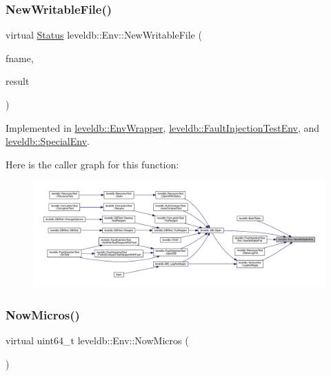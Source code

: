 \subsubsection{\texorpdfstring{NewWritableFile()}{NewWritableFile()}}
{\footnotesize\ttfamily virtual \mbox{\hyperlink{classleveldb_1_1_status}{Status}} leveldb\+::\+Env\+::\+New\+Writable\+File (\begin{DoxyParamCaption}\item[{const std\+::string \&}]{fname,  }\item[{\mbox{\hyperlink{classleveldb_1_1_writable_file}{Writable\+File}} $\ast$$\ast$}]{result }\end{DoxyParamCaption})\hspace{0.3cm}{\ttfamily [pure virtual]}}



Implemented in \mbox{\hyperlink{classleveldb_1_1_env_wrapper_a3e4991deec0666b177cf0f699efa2ca8}{leveldb\+::\+Env\+Wrapper}}, \mbox{\hyperlink{classleveldb_1_1_fault_injection_test_env_a1e89cf48116748a2f7d8c07022eab4f7}{leveldb\+::\+Fault\+Injection\+Test\+Env}}, and \mbox{\hyperlink{classleveldb_1_1_special_env_a2a8b88051ccc5f957321d47af0dae5ed}{leveldb\+::\+Special\+Env}}.

Here is the caller graph for this function\+:
\nopagebreak
\begin{figure}[H]
\begin{center}
\leavevmode
\includegraphics[width=350pt]{classleveldb_1_1_env_a4566194f3e82fede425fdb5bb355f7de_icgraph}
\end{center}
\end{figure}
\mbox{\label{classleveldb_1_1_env_a988062bcd558ac02c62522ac2c8aa39f}} 
\subsubsection{\texorpdfstring{NowMicros()}{NowMicros()}}
{\footnotesize\ttfamily virtual uint64\+\_\+t leveldb\+::\+Env\+::\+Now\+Micros (\begin{DoxyParamCaption}{ }\end{DoxyParamCaption})\hspace{0.3cm}{\ttfamily [pure virtual]}}



